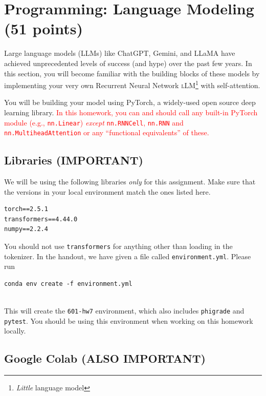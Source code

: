 \documentclass[11pt,addpoints,answers]{exam}
\begin{document}
\begin{your_solution}[height=6cm]

\end{your_solution}

\newpage
\section{Programming: Language Modeling (51 points)}
\label{programming}

Large language models (LLMs) like ChatGPT, Gemini, and LLaMA have achieved unprecedented levels of success (and hype) over the past few years. In this section, you will become familiar with the building blocks of these models by implementing your very own Recurrent Neural Network \textsc{l}LM\footnote{\textit{Little} language model} with self-attention.

You will be building your model using PyTorch, a widely-used open source deep learning library. \textcolor{red}{In this homework, you can and should call any built-in PyTorch module (e.g., \texttt{nn.Linear}) \textit{except} \texttt{nn.RNNCell}, \texttt{nn.RNN} and \texttt{nn.MultiheadAttention} or any “functional equivalents” of these.}



\subsection{Libraries (IMPORTANT)}

We will be using the following libraries \textit{only} for this assignment. Make sure that the versions in your local environment match the ones listed here.

\begin{lstlisting}
torch==2.5.1
transformers==4.44.0
numpy==2.2.4
\end{lstlisting}

You should not use \texttt{transformers} for anything other than loading in the tokenizer. In the handout, we have given a file called \texttt{environment.yml}. Please run \begin{lstlisting}
conda env create -f environment.yml
    
\end{lstlisting}
This will create the \texttt{601-hw7} environment, which also includes \texttt{phigrade} and \texttt{pytest}. You should be using this environment when working on this homework locally.
\subsection{Google Colab (ALSO IMPORTANT)}
\end{document}
